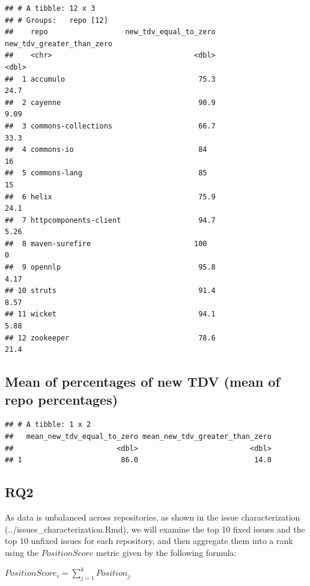 \documentclass[
]{article}
\begin{document}
\begin{verbatim}
## # A tibble: 12 x 3
## # Groups:   repo [12]
##    repo                  new_tdv_equal_to_zero new_tdv_greater_than_zero
##    <chr>                                 <dbl>                     <dbl>
##  1 accumulo                               75.3                     24.7 
##  2 cayenne                                90.9                      9.09
##  3 commons-collections                    66.7                     33.3 
##  4 commons-io                             84                       16   
##  5 commons-lang                           85                       15   
##  6 helix                                  75.9                     24.1 
##  7 httpcomponents-client                  94.7                      5.26
##  8 maven-surefire                        100                        0   
##  9 opennlp                                95.8                      4.17
## 10 struts                                 91.4                      8.57
## 11 wicket                                 94.1                      5.88
## 12 zookeeper                              78.6                     21.4
\end{verbatim}

\subsection{Mean of percentages of new TDV (mean of repo
percentages)}\label{mean-of-percentages-of-new-tdv-mean-of-repo-percentages}

\begin{verbatim}
## # A tibble: 1 x 2
##   mean_new_tdv_equal_to_zero mean_new_tdv_greater_than_zero
##                        <dbl>                          <dbl>
## 1                       86.0                           14.0
\end{verbatim}

\subsection{RQ2}\label{rq2}

As data is unbalanced across repositories, as shown in the issue
characterization (../issues\_characterization.Rmd), we will examine the
top 10 fixed issues and the top 10 unfixed issues for each repository,
and then aggregate them into a rank using the \(PositionScore\) metric
given by the following formula:

\(PositionScore_{i} = \sum\limits_{j=1}^{k} Position_{j}\)
\end{document}
